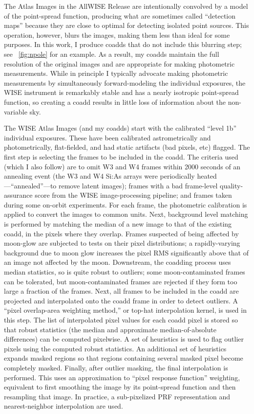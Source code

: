 \documentclass[11pt,preprint]{aastex}
\newcommand{\figref}[1]{\figurename~\ref{#1}}
\begin{document}
The Atlas Images in the AllWISE Release are intentionally convolved by
a model of the point-spread function, producing what are sometimes
called ``detection maps'' because they are close to optimal for
detecting isolated point sources.  This operation, however, blurs the
images, making them less than ideal for some purposes.  In this work,
I produce coadds that do not include this blurring step; see
\figref{fig:npole} for an example.  As a result, my coadds maintain
the full resolution of the original images and are appropriate for
making photometric measurements.  While in principle I typically
advocate making photometric measurements by simultaneously
forward-modeling the individual exposures, the WISE instrument is
remarkably stable and has a nearly isotropic point-spread function, so
creating a coadd results in little loss of information about the
non-variable sky.


The WISE Atlas Images (and my coadds) start with the calibrated
``level 1b'' individual exposures.  These have been calibrated
astrometrically and photometrically, flat-fielded, and had static
artifacts (bad pixels, etc) flagged.  The first step is selecting the
frames to be included in the coadd.  The criteria used (which I also
follow) are to omit W3 and W4 frames within 2000 seconds of an
annealing event (the W3 and W4 Si:As arrays were periodically
heated---``annealed''---to remove latent images); frames with a bad
frame-level quality-assurance score from the WISE image-processing
pipeline; and frames taken during some on-orbit experiments.  For each
frame, the photometric calibration is applied to convert the images to
common units.  Next, background level matching is performed by
matching the median of a new image to that of the existing coadd, in
the pixels where they overlap.  Frames suspected of being affected by
moon-glow are subjected to tests on their pixel distributions; a
rapidly-varying background due to moon glow increases the pixel RMS
significantly above that of an image not affected by the moon.
Downstream, the coadding process uses median statistics, so is quite
robust to outliers; some moon-contaminated frames can be tolerated,
but moon-contaminated frames are rejected if they form too large a
fraction of the frames.  Next, all frames to be included in the
coadd are projected and interpolated onto the coadd frame in order to
detect outliers.  A ``pixel overlap-area weighting method,'' or
top-hat interpolation kernel, is used in this step.  The list of
interpolated pixel values for each coadd pixel is stored so that
robust statistics (the median and approximate median-of-absolute
differences) can be computed pixelwise.  A set of heuristics is used
to flag outlier pixels using the computed robust statistics.  An
additional set of heuristics expands masked regions so that regions
containing several masked pixel become completely masked.  Finally,
after outlier masking, the final interpolation is performed.  This
uses an approximation to ``pixel response function'' weighting,
equivalent to first smoothing the image by its point-spread function
and then resampling that image.  In practice, a sub-pixelized PRF
representation and nearest-neighbor interpolation are used.
\end{document}
